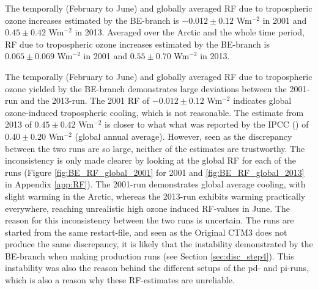 \medskip

The temporally (February to June) and globally averaged RF due to tropospheric ozone increases estimated by the BE-branch is $-0.012\pm0.12$ Wm$^{-2}$ in 2001 and $0.45\pm0.42$ Wm$^{-2}$ in 2013. Averaged over the Arctic and the whole time period, RF due to tropospheric ozone increases estimated by the BE-branch is $0.065\pm0.069$ Wm$^{-2}$ in 2001 and $0.55\pm0.70$ Wm$^{-2}$ in 2013.

The temporally (February to June) and globally averaged RF due to tropospheric ozone yielded by the BE-branch demonstrates large deviations between the 2001-run and the 2013-run. The 2001 RF of $-0.012\pm0.12$ Wm$^{-2}$ indicates global ozone-induced tropospheric cooling, which is not reasonable. The estimate from 2013 of $0.45\pm0.42$ Wm$^{-2}$ is closer to what what was reported by the IPCC (\cite{IPCCchapter8}) of $0.40\pm0.20$ Wm$^{-2}$ (global annual average). However, seen as the discrepancy between the two runs are so large, neither of the estimates are trustworthy. The inconsistency is only made clearer by looking at the global RF for each of the runs  (Figure \ref{fig:BE_RF_global_2001} for 2001 and \ref{fig:BE_RF_global_2013} in Appendix \ref{app:RF}). The 2001-run demonstrates global average cooling, with slight warming in the Arctic, whereas the 2013-run exhibits warming practically everywhere, reaching unrealistic high ozone induced RF-values in June. The reason for this inconsistency between the two runs is uncertain. The runs are started from the same restart-file, and seen as the Original CTM3 does not produce the same discrepancy, it is likely that the instability demonstrated by the BE-branch when making production runs (see Section \ref{sec:disc_step4}). This instability was also the reason behind the different setups of the \acrshort{pd}- and \acrshort{pi}-runs, which is also a reason why these RF-estimates are unreliable.




